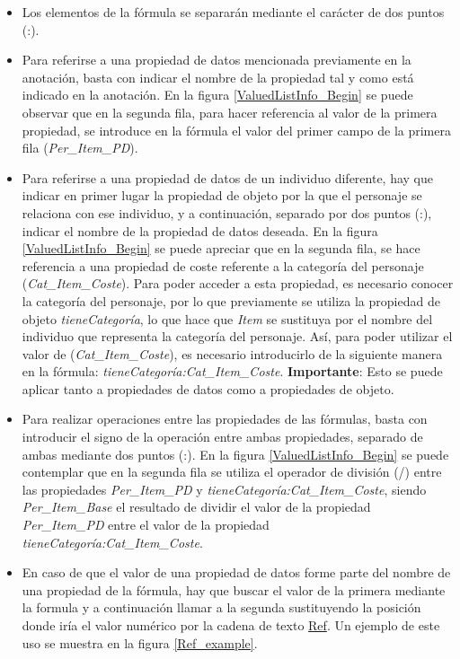 \begin{itemize}
    \item Los elementos de la fórmula se separarán mediante el carácter de dos puntos (:).
    
    \item Para referirse a una propiedad de datos mencionada previamente en la anotación, basta con indicar el nombre de la 
    propiedad tal y como está indicado en la anotación. En la figura \ref*{ValuedListInfo_Begin} se puede observar que 
    en la segunda fila, para hacer referencia al valor de la primera propiedad, se introduce en la fórmula el valor del 
    primer campo de la primera fila (\textit{Per\_Item\_PD}).

    \item Para referirse a una propiedad de datos de un individuo diferente, hay que indicar en primer lugar la propiedad 
    de objeto por la que el personaje se relaciona con ese individuo, y a continuación, separado por dos puntos (:), indicar 
    el nombre de la propiedad de datos deseada. En la figura \ref*{ValuedListInfo_Begin} se puede apreciar que en la segunda 
    fila, se hace referencia a una propiedad de coste referente a la categoría del personaje (\textit{Cat\_Item\_Coste}).
    Para poder acceder a esta propiedad, es necesario conocer la categoría del personaje, por lo que previamente se utiliza 
    la propiedad de objeto \textit{tieneCategoría}, lo que hace que \textit{Item} se sustituya por el nombre del individuo que 
    representa la categoría del personaje. Así, para poder utilizar el valor de (\textit{Cat\_Item\_Coste}), es necesario introducirlo 
    de la siguiente manera en la fórmula: \textit{tieneCategoría:Cat\_Item\_Coste}. \textbf{Importante}: Esto se puede aplicar tanto 
    a propiedades de datos como a propiedades de objeto.

    \item Para realizar operaciones entre las propiedades de las fórmulas, basta con introducir el signo de la operación entre ambas 
    propiedades, separado de ambas mediante dos puntos (:). En la figura \ref*{ValuedListInfo_Begin} se puede contemplar que en la 
    segunda fila se utiliza el operador de división (/) entre las propiedades \textit{Per\_Item\_PD} y 
    \textit{tieneCategoría:Cat\_Item\_Coste}, siendo \textit{Per\_Item\_Base} el resultado de dividir el valor de la propiedad 
    \textit{Per\_Item\_PD} entre el valor de la propiedad \textit{tieneCategoría:Cat\_Item\_Coste}.

    \newpage
    \item En caso de que el valor de una propiedad de datos forme parte del nombre de una propiedad de la fórmula, hay que 
    buscar el valor de la primera mediante la formula y a continuación llamar a la segunda sustituyendo la posición donde 
    iría el valor numérico por la cadena de texto \underline{Ref}. Un ejemplo de este uso se muestra en la figura \ref*{Ref_example}.


\end{itemize}

